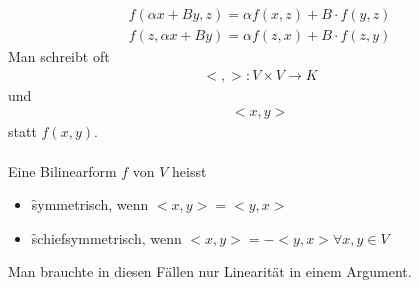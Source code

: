\begin{align}
f(\alpha x + B y, z) =\alpha f(x, z) + B\cdot f(y, z) \\
f(z, \alpha x + B y) =\alpha f(z, x) + B\cdot f(z, y)
\end{align}
Man schreibt oft 
\begin{align}
<, >: V \times V \rightarrow K
\end{align}
und
\begin{align}
<x, y> 
\end{align}
statt $f(x, y)$. \\\\
Eine Bilinearform $f$ von $V$ heisst
\begin{itemize}
\item \f{symmetrisch}, wenn $<x, y> = <y, x>$
\item \f{schiefsymmetrisch}, wenn $<x, y> = -<y, x> \forall x, y \in V$
\end{itemize}
Man brauchte in diesen Fällen nur Linearität in einem Argument.

